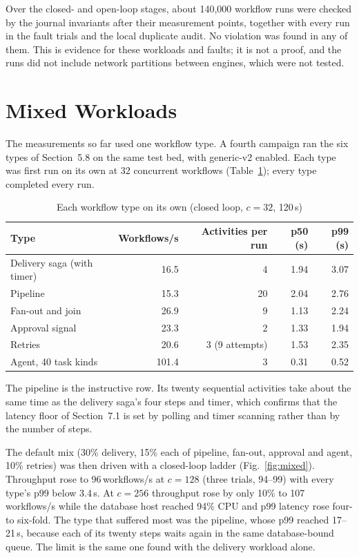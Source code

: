 Over the closed- and open-loop stages, about 140,000 workflow runs were
checked by the journal invariants after their measurement points, together
with every run in the fault trials and the local duplicate audit. No
violation was found in any of them. This is evidence for these workloads and
faults; it is not a proof, and the runs did not include network partitions
between engines, which were not tested.

\section{Mixed Workloads}
\label{sec:mixed}

The measurements so far used one workflow type. A fourth campaign ran the six
types of Section~5.8 on the same test bed, with generic-v2 enabled. Each type
was first run on its own at 32 concurrent workflows
(Table~\ref{tab:mixsingle}); every type completed every run.

\begin{table}[htbp]
  \centering
  \caption{Each workflow type on its own (closed loop, $c=32$, 120\,s)}
  \label{tab:mixsingle}
  \small
  \begin{tabular}{|l|r|r|r|r|}
    \hline
    \textbf{Type} & \textbf{Workflows/s} & \textbf{Activities per run} &
      \textbf{p50 (s)} & \textbf{p99 (s)} \\
    \hline
    Delivery saga (with timer) & 16.5 & 4 & 1.94 & 3.07 \\
    \hline
    Pipeline & 15.3 & 20 & 2.04 & 2.76 \\
    \hline
    Fan-out and join & 26.9 & 9 & 1.13 & 2.24 \\
    \hline
    Approval signal & 23.3 & 2 & 1.33 & 1.94 \\
    \hline
    Retries & 20.6 & 3 (9 attempts) & 1.53 & 2.35 \\
    \hline
    Agent, 40 task kinds & 101.4 & 3 & 0.31 & 0.52 \\
    \hline
  \end{tabular}
\end{table}

The pipeline is the instructive row. Its twenty sequential activities take
about the same time as the delivery saga's four steps and timer, which
confirms that the latency floor of Section~7.1 is set by polling and timer
scanning rather than by the number of steps.

The default mix (30\% delivery, 15\% each of pipeline, fan-out, approval and
agent, 10\% retries) was then driven with a closed-loop ladder
(Fig.~\ref{fig:mixed}). Throughput rose to 96\,workflows/s at $c=128$ (three
trials, 94--99) with every type's p99 below 3.4\,s. At $c=256$ throughput
rose by only 10\% to 107\,workflows/s while the database host reached 94\%
CPU and p99 latency rose four- to six-fold. The type that suffered most was
the pipeline, whose p99 reached 17--21\,s, because each of its twenty steps
waits again in the same database-bound queue. The limit is the same one
found with the delivery workload alone.

